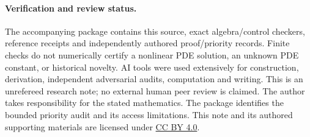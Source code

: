 \documentclass[11pt]{article}
\begin{document}
\paragraph{Verification and review status.}
The accompanying package contains this source, exact algebra/control
checkers, reference receipts and independently authored proof/priority
records. Finite checks do not numerically certify a nonlinear PDE solution,
an unknown PDE constant, or historical novelty. AI tools were used
extensively for construction, derivation, independent adversarial audits,
computation and writing. This is an unrefereed research note; no external
human peer review is claimed. The author takes responsibility for the
stated mathematics. The package identifies the bounded priority audit and
its access limitations.
This note and its authored supporting materials are licensed under
\href{https://creativecommons.org/licenses/by/4.0/}{CC BY 4.0}.
\end{document}
